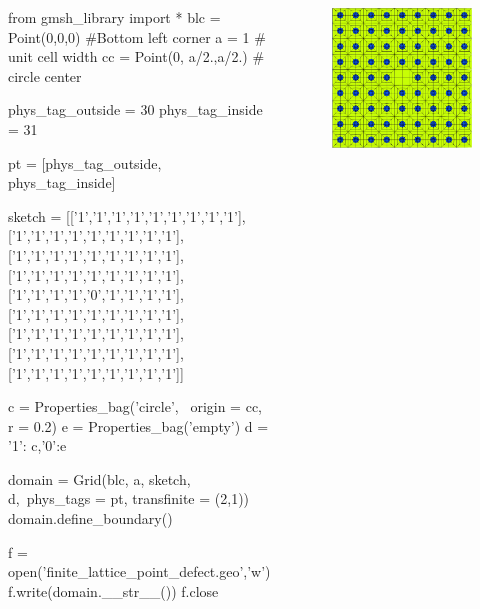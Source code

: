 \documentclass[xcolor=table,serif]{beamer}
\begin{document}
	\begin{frame}[fragile]
		\begin{columns}
			\tiny
			\begin{python}
			from gmsh_library import * 
blc = Point(0,0,0) #Bottom left corner
a = 1 # unit cell width
cc = Point(0, a/2.,a/2.) # circle center

phys_tag_outside = 30
phys_tag_inside = 31

pt = [phys_tag_outside, phys_tag_inside] 

sketch =
 [['1','1','1','1','1','1','1','1','1'],
  ['1','1','1','1','1','1','1','1','1'],
  ['1','1','1','1','1','1','1','1','1'],
  ['1','1','1','1','1','1','1','1','1'],
  ['1','1','1','1','0','1','1','1','1'],
  ['1','1','1','1','1','1','1','1','1'],
  ['1','1','1','1','1','1','1','1','1'],
  ['1','1','1','1','1','1','1','1','1'],
  ['1','1','1','1','1','1','1','1','1']]
  
c = Properties_bag('circle', \
		 origin = cc, r = 0.2)
e = Properties_bag('empty')
d = {'1': c,'0':e}

domain = Grid(blc, a, sketch, d,\
 phys_tags = pt, transfinite = (2,1))
domain.define_boundary()

f = open('finite_lattice_point_defect.geo','w')
f.write(domain.__str__())
f.close
			\end{python}
			\begin{figure}
			\centering
			\includegraphics[scale=0.2]{lattice_point_deffect.pdf}
			\end{figure}
		\end{columns}
	\end{frame}
\end{document}
